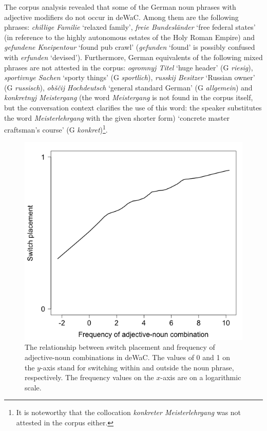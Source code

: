 The corpus analysis revealed that some of the German noun phrases with adjective modifiers do not occur in deWaC. Among them are the following phrases: \textit{chillige Familie} `relaxed family', \textit{freie Bundesländer} `free federal states' (in reference to the highly autonomous estates of the Holy Roman Empire) and \textit{gefundene Kneipentour} `found pub crawl' (\textit{gefunden} `found' is possibly confused with \textit{erfunden} `devised'). Furthermore, German equivalents of the following mixed phrases are not attested in the corpus: \textit{ogromnyj Titel} `huge header' (G \textit{riesig}), \textit{sportivnye Sachen} `sporty things' (G \textit{sportlich}), \textit{russkij Besitzer} `Russian owner' (G \textit{russisch}), \textit{obščij Hochdeutsch} `general standard German' (G \textit{allgemein}) and \textit{konkretnyj Meistergang} (the word \textit{Meistergang} is not found in the corpus itself, but the conversation context clarifies the use of this word: the speaker substitutes the word \textit{Meisterlehrgang} with the given shorter form) `concrete master craftsman's course' (G \textit{konkret})\footnote{It is noteworthy that the collocation \textit{konkreter Meisterlehrgang} was not attested in the corpus either.}.

\begin{figure}
    	\includegraphics[scale=0.5]{figures/4-Fr_co-occ.png}
	\caption{The relationship between switch placement and frequency of adjective-noun combinations in deWaC. The values of 0 and 1 on the $y$-axis stand for switching within and outside the noun phrase, respectively. The frequency values on the $x$-axis are on a logarithmic scale.\label{fig:4:co-occ}}
\end{figure}

